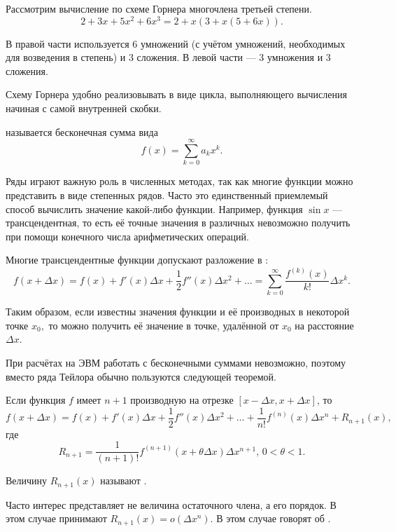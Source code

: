 \begin{example}
  Рассмотрим вычисление по схеме Горнера многочлена третьей степени.
  \[
  2 + 3x + 5 x^2 + 6 x^3 = 2 + x(3 + x(5 + 6 x)).
  \]

  В правой части используется 6 умножений (с учётом умножений,
  необходимых для возведения в степень) и 3 сложения. В левой части —
  3 умножения и 3 сложения.
\end{example}

Схему Горнера удобно реализовывать в виде цикла, выполняющего
вычисления начиная с самой внутренней скобки.


 называется бесконечная сумма
вида
\[
f(x) = \sum_{k=0}^{\infty} a_k x^k.
\]

Ряды играют важную роль в численных методах, так как многие функции
можно представить в виде степенных рядов. Часто это единственный
приемлемый способ вычислить значение какой-либо функции. Например,
функция $\sin x$ — трансцендентная, то есть её точные значения в
различных невозможно получить при помощи конечного числа
арифметических операций.

Многие трансцендентные функции допускают разложение в
:
\[
  f(x + \Delta x) =
  f(x) + f'(x) \Delta x + \frac12 f''(x) \Delta x^2 + \ldots =
  \sum_{k=0}^{\infty}\frac{f^{(k)}(x)}{k!}\Delta x^{k}.
\]

Таким образом, если известны значения функции и её производных в
некоторой точке $x_{0},$ то можно получить её значение в точке,
удалённой от $x_{0}$ на расстояние $\Delta x$.

При расчётах на ЭВМ работать с бесконечными суммами невозможно,
поэтому вместо ряда Тейлора обычно пользуются следующей теоремой.

\begin{thm}
  Если функция $f$ имеет $n+1$ производную на отрезке $[x - \Delta x,
    x + \Delta x]$, то
  \[
  \boxed{
  f(x + \Delta x) =
  f(x) + f'(x) \Delta x + \frac12 f''(x) \Delta x^2 + \ldots
  + \frac1{n!} f^{(n)}(x) \Delta x^n + R_{n+1}(x),
  }
  \]
  где
  \[
  R_{n+1} = \frac1{(n+1)!} f^{(n+1)}(x+\theta\Delta x)\Delta x^{n+1},
  \, 0<\theta<1.
  \]
\end{thm}

Величину $R_{n+1}(x)$ называют .

Часто интерес представляет не величина остаточного члена, а его
порядок. В этом случае принимают $R_{n+1}(x) = o(\Delta x^n).$ В этом
случае говорят об .

